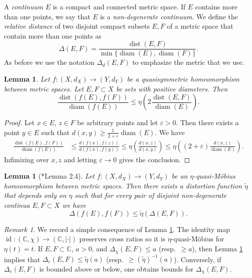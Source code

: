 \documentclass[letterpaper]{amsart}
\theoremstyle{plain}
\newtheorem{lemma}[theorem]{Lemma}
\theoremstyle{definition}
\theoremstyle{remark}
\newtheorem{remark}[theorem]{Remark}
\numberwithin{equation}{section}
\numberwithin{theorem}{section}
\newcommand{\C}{\mathbb C}
\DeclareMathOperator{\dist}{dist}
\DeclareMathOperator{\diam}{diam}
\DeclareMathOperator{\id}{id}
\begin{document}
A \textit{continuum} $E$ is a compact and connected metric space. If $E$ contains more than one points, we say that $E$ is a \textit{non-degenerate continuum}. We define the \textit{relative distance} of two disjoint compact subsets $E,F$ of a metric space that contain more than one points as 
$$\Delta(E,F)=\frac{\dist(E,F)}{\min\{\diam(E),\diam(F)\}}.$$
As before we use the notation $\Delta_d(E,F)$ to emphasize the metric that we use. 

\begin{lemma}\label{lemma:quasisymmetric_relative_distance}
Let $f\colon (X,d_X)\to (Y,d_Y)$ be a quasisymmetric homeomorphism between metric spaces. Let $E,F\subset X$ be sets with positive diameters. Then 
$$ \frac{\dist(f(E),f(F))}{\diam (f(E)) }\leq \eta\left(2\frac{\dist(E,F)}{\diam (E)}\right).$$
\end{lemma}

\begin{proof}
Let $x\in E$, $z\in F$ be arbitrary points and let $\varepsilon>0$. Then there exists a point $y\in E$ such that $d(x,y)\geq \frac{1}{2+\varepsilon}\diam (E)$. We have
\begin{align*}
 \frac{\dist(f(E),f(F))}{\diam (f(E)) }&\leq \frac{d(f(x), f(z))}{d(f(x), f(y))}\leq \eta\left(\frac{d(x,z)}{d(x,y)}\right)\leq \eta \left((2+\varepsilon) \frac{d(x,z)}{\diam (E)}\right).
\end{align*}
Infimizing over $x,z$ and letting $\varepsilon\to 0$ gives the conclusion.
\end{proof}

\begin{lemma}[\cite{Ntalampekos:schottky}*{Lemma 2.4}]\label{lemma:quasimobius:cross}
Let $f\colon (X,d_X)\to (Y,d_Y)$ be an $\eta$-quasi-M\"obius homeomorphism between metric spaces. Then there exists a distortion function $\widetilde \eta$ that depends only on $\eta$ such that for every pair of disjoint non-degenerate continua $E,F\subset X$ we have
$$\Delta(f(E),f(F)) \leq \widetilde \eta ( \Delta(E,F)).$$
\end{lemma}

\begin{remark}\label{remark:quasimobius:cross}
We record a simple consequence of Lemma \ref{lemma:quasimobius:cross}. The identity map $\id\colon (\C,\chi)\to (\C,|\cdot|)$ preserves cross ratios so it is $\eta$-quasi-M\"obius for $\eta(t)=t$. If $E,F\subset \C$, $a>0$, and $\Delta_\chi(E,F)\leq a$ (resp.\ $\geq a$), then Lemma \ref{lemma:quasimobius:cross} implies that $\Delta_e(E,F)\leq \widetilde \eta(a)$ (resp.\ $\geq (\widetilde \eta)^{-1}(a)$). Conversely, if $\Delta_e(E,F)$ is bounded above or below, one obtains bounds for $\Delta_\chi(E,F)$.
\end{remark}
\end{document}
